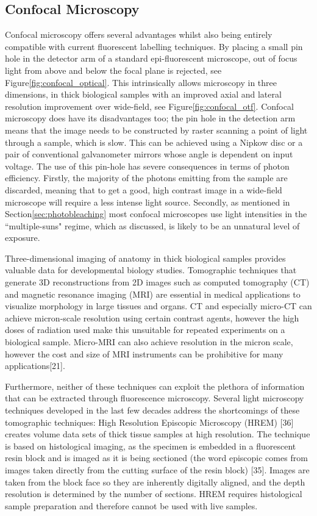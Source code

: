 \subsection{Confocal Microscopy}

Confocal microscopy offers several advantages whilst also being entirely compatible with current fluorescent labelling techniques.
By placing a small pin hole in the detector arm of a standard epi-fluorescent microscope, out of focus light from above and below the focal plane is rejected\cite{Minsky1957}, see Figure\ref{fig:confocal_optical}.
This intrinsically allows microscopy in three dimensions, in thick biological samples with an improved axial and lateral resolution improvement over wide-field\cite{Claxton2006}, see Figure\ref{fig:confocal_otf}.
Confocal microscopy does have its disadvantages too; the pin hole in the detection arm means that the image needs to be constructed by raster scanning a point of light through a sample, which is slow.
This can be achieved using a Nipkow disc or a pair of conventional galvanometer mirrors whose angle is dependent on input voltage.
The use of this pin-hole has severe consequences in terms of photon efficiency.
Firstly, the majority of the photons emitting from the sample are discarded, meaning that to get a good, high contrast image in a wide-field microscope will require a less intense light source.
Secondly, as mentioned in Section\ref{sec:photobleaching} most confocal microscopes use light intensities in the ``multiple-suns" regime\cite{Stelzer2015}, which as discussed, is likely to be an unnatural level of exposure.


Three-dimensional imaging of anatomy in thick biological samples provides valuable data for developmental biology studies.
Tomographic techniques that generate 3D reconstructions from 2D images such as computed tomography (CT) and magnetic resonance imaging (MRI) are essential in medical applications to visualize morphology in large tissues and organs.
CT and especially micro-CT can achieve micron-scale resolution using certain contrast agents, however the high doses of radiation used make this unsuitable for repeated experiments on a biological sample.
Micro-MRI can also achieve resolution in the micron scale, however the cost and size of MRI instruments can be prohibitive for many applications[21].

Furthermore, neither of these techniques can exploit the plethora of information that can be extracted through fluorescence microscopy.
Several light microscopy techniques developed in the last few decades address the shortcomings of these tomographic techniques:
High Resolution Episcopic Microscopy (HREM) [36] creates volume data sets of thick tissue samples at high resolution.
The technique is based on histological imaging, as the specimen is embedded in a fluorescent resin block and is imaged as it is being sectioned (the word episcopic comes from images taken directly from the cutting surface of the resin
block) [35].
Images are taken from the block face so they are inherently digitally aligned, and the depth resolution is determined by the number of sections. HREM requires histological sample preparation and therefore cannot be used with live samples.

